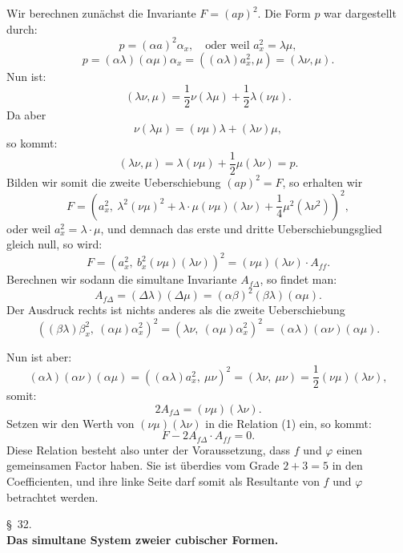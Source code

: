\documentclass[11pt]{article}
\providecommand{\weberpage}[1]{}
\providecommand{\weq}[2]{\begin{equation}\tag{#1}#2\end{equation}}
\let\Delta\varDelta
\begin{document}
Wir berechnen zunächst die Invariante $F = (ap)^2$. Die Form $p$ war
dargestellt durch:
\[
p = (\alpha a)^2 \alpha_x, \quad \text{oder weil } a_x^2 = \lambda\mu,
\]
\[
p = (\alpha\lambda)(\alpha\mu)\alpha_x = ((\alpha\lambda)a_x^2, \mu) = (\lambda\nu, \mu).
\]
Nun ist:
\[
(\lambda\nu, \mu) = \frac{1}{2}\nu(\lambda\mu) + \frac{1}{2}\lambda(\nu\mu).
\]
Da aber
\[
\nu(\lambda\mu) = (\nu\mu)\lambda + (\lambda\nu)\mu,
\]
so kommt:
\[
(\lambda\nu, \mu) = \lambda(\nu\mu) + \frac{1}{2}\mu(\lambda\nu) = p.
\]
Bilden wir somit die zweite Ueberschiebung $(ap)^2 = F$, so erhalten wir
\[
F = \left(a_x^2, \ \lambda^2(\nu\mu)^2 + \lambda\cdot\mu(\nu\mu)(\lambda\nu) + \frac{1}{4}\mu^2(\lambda\nu^2)\right)^2,
\]
oder weil $a_x^2 = \lambda\cdot\mu$, und demnach das erste und dritte
Ueberschiebungsglied gleich null, so wird:
\weq{1}{F = (a_x^2, \ b_x^2(\nu\mu)(\lambda\nu))^2 = (\nu\mu)(\lambda\nu)\cdot A_{ff}.}
Berechnen wir sodann die simultane Invariante $A_{f\Delta}$, so findet man:
\[
A_{f\Delta} = (\Delta\lambda)(\Delta\mu) = (\alpha\beta)^2(\beta\lambda)(\alpha\mu).
\]
Der Ausdruck rechts ist nichts anderes als die zweite Ueberschiebung
\[
((\beta\lambda)\beta_x^2, \ (\alpha\mu)\alpha_x^2)^2 = (\lambda\nu, \ (\alpha\mu)\alpha_x^2)^2 = (\alpha\lambda)(\alpha\nu)(\alpha\mu).
\]


\weberpage{330}

Nun ist aber:
\[
(\alpha\lambda)(\alpha\nu)(\alpha\mu) = ((\alpha\lambda)a_x^2, \ \mu\nu)^2 = (\lambda\nu, \ \mu\nu) = \frac{1}{2}(\nu\mu)(\lambda\nu),
\]
somit:
\weq{2}{2A_{f\Delta} = (\nu\mu)(\lambda\nu).}
Setzen wir den Werth von $(\nu\mu)(\lambda\nu)$ in die Relation (1) ein, so
kommt:
\[
F - 2A_{f\Delta}\cdot A_{ff} = 0.
\]
Diese Relation besteht also unter der Voraussetzung, dass $f$ und $\varphi$
einen gemeinsamen Factor haben. Sie ist überdies vom Grade $2 + 3 = 5$ in
den Coefficienten, und ihre linke Seite darf somit als Resultante von $f$
und $\varphi$ betrachtet werden.

\begin{center}
\S~32. \\
\textbf{Das simultane System zweier cubischer Formen.}
\end{center}
\end{document}
